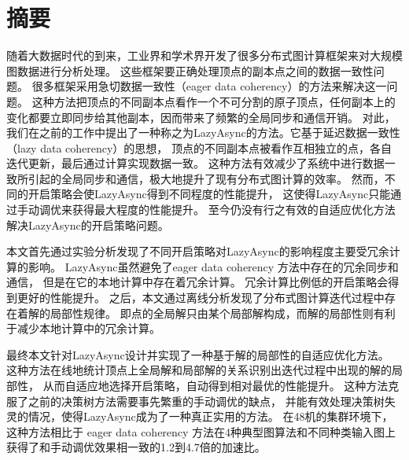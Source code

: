 \maketitle%
\MAKETITLE%
\makedeclaration%
\intobmk\chapter*{摘\quad 要}%
\setcounter{page}{1}%

随着大数据时代的到来，工业界和学术界开发了很多分布式图计算框架来对大规模图数据进行分析处理。
这些框架要正确处理顶点的副本点之间的数据一致性问题。
很多框架采用急切数据一致性（eager data coherency）的方法来解决这一问题。
这种方法把顶点的不同副本点看作一个不可分割的原子顶点，任何副本上的变化都要立即同步给其他副本，因而带来了频繁的全局同步和通信开销。
对此，我们在之前的工作中提出了一种称之为LazyAsync的方法。它基于延迟数据一致性（lazy data coherency）的思想，
顶点的不同副本点被看作互相独立的点，各自迭代更新，最后通过计算实现数据一致。
这种方法有效减少了系统中进行数据一致所引起的全局同步和通信，极大地提升了现有分布式图计算的效率。
然而，不同的开启策略会使LazyAsync得到不同程度的性能提升，
这使得LazyAsync只能通过手动调优来获得最大程度的性能提升。
至今仍没有行之有效的自适应优化方法解决LazyAsync的开启策略问题。

本文首先通过实验分析发现了不同开启策略对LazyAsync的影响程度主要受冗余计算的影响。
LazyAsync虽然避免了eager data coherency 方法中存在的冗余同步和通信，
但是在它的本地计算中存在着冗余计算。
冗余计算比例低的开启策略会得到更好的性能提升。
之后，本文通过离线分析发现了分布式图计算迭代过程中存在着解的局部性规律。
即点的全局解只由某个局部解构成，而解的局部性则有利于减少本地计算中的冗余计算。

最终本文针对LazyAsync设计并实现了一种基于解的局部性的自适应优化方法。
这种方法在线地统计顶点上全局解和局部解的关系识别出迭代过程中出现的解的局部性，
从而自适应地选择开启策略，自动得到相对最优的性能提升。
这种方法克服了之前的决策树方法需要事先繁重的手动调优的缺点，
并能有效处理决策树失灵的情况，使得LazyAsync成为了一种真正实用的方法。
在48机的集群环境下，这种方法相比于 eager data coherency 方法在4种典型图算法和不同种类输入图上
获得了和手动调优效果相一致的1.2到4.7倍的加速比。




